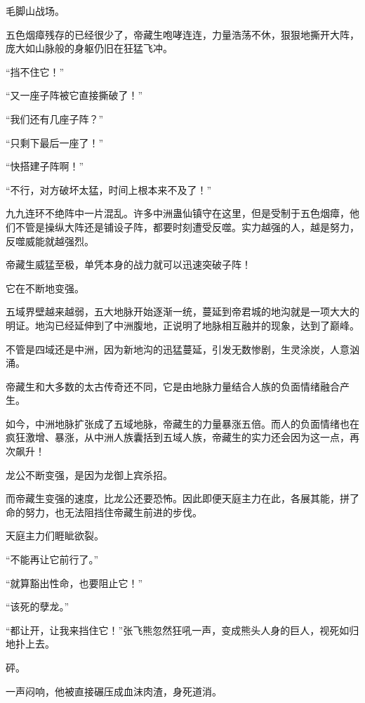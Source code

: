 
\begin{this_body}



毛脚山战场。

五色烟瘴残存的已经很少了，帝藏生咆哮连连，力量浩荡不休，狠狠地撕开大阵，庞大如山脉般的身躯仍旧在狂猛飞冲。

“挡不住它！”

“又一座子阵被它直接撕破了！”

“我们还有几座子阵？”

“只剩下最后一座了！”

“快搭建子阵啊！”

“不行，对方破坏太猛，时间上根本来不及了！”

九九连环不绝阵中一片混乱。许多中洲蛊仙镇守在这里，但是受制于五色烟瘴，他们不管是操纵大阵还是铺设子阵，都要时刻遭受反噬。实力越强的人，越是努力，反噬威能就越强烈。

帝藏生威猛至极，单凭本身的战力就可以迅速突破子阵！

它在不断地变强。

五域界壁越来越弱，五大地脉开始逐渐一统，蔓延到帝君城的地沟就是一项大大的明证。地沟已经延伸到了中洲腹地，正说明了地脉相互融并的现象，达到了巅峰。

不管是四域还是中洲，因为新地沟的迅猛蔓延，引发无数惨剧，生灵涂炭，人意汹涌。

帝藏生和大多数的太古传奇还不同，它是由地脉力量结合人族的负面情绪融合产生。

如今，中洲地脉扩张成了五域地脉，帝藏生的力量暴涨五倍。而人的负面情绪也在疯狂激增、暴涨，从中洲人族囊括到五域人族，帝藏生的实力还会因为这一点，再次飙升！

龙公不断变强，是因为龙御上宾杀招。

而帝藏生变强的速度，比龙公还要恐怖。因此即便天庭主力在此，各展其能，拼了命的努力，也无法阻挡住帝藏生前进的步伐。

天庭主力们睚眦欲裂。

“不能再让它前行了。”

“就算豁出性命，也要阻止它！”

“该死的孽龙。”

“都让开，让我来挡住它！”张飞熊忽然狂吼一声，变成熊头人身的巨人，视死如归地扑上去。

砰。

一声闷响，他被直接碾压成血沫肉渣，身死道消。


\end{this_body}
